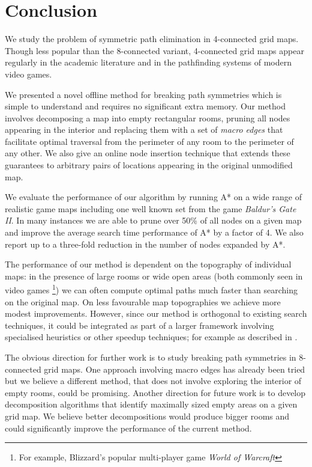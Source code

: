 \section{Conclusion}
We study the problem of symmetric path elimination in 4-connected grid maps.
Though less popular than the 8-connected variant, 4-connected grid maps appear 
regularly in the academic literature and in the pathfinding systems of modern
video games.
\par
We presented a novel offline method for breaking path symmetries which is simple
to understand and requires no significant extra memory. 
Our method involves decomposing a map into empty rectangular rooms, pruning all nodes
appearing in the interior and replacing them with a set of \emph{macro edges}
that facilitate optimal traversal from the perimeter of any room to the perimeter
of any other.
We also give an online node insertion technique that extends these guarantees
 to arbitrary pairs of locations appearing in the original unmodified map.
\par
We evaluate the performance of our algorithm by running A* on a wide
range of realistic game maps including one well known set from the game
\emph{Baldur's Gate II}. 
In many instances we are able to prune over 50\% of all nodes on a given map
and improve the average search time performance of A* by a factor of 4.
We also report up to a three-fold reduction in the number of nodes expanded
by A*.
\par
The performance of our method is dependent on the topography of individual maps: 
in the presence of large rooms or wide open areas (both commonly seen in video games 
\footnote{For example, Blizzard's popular multi-player game \emph{World of Warcraft}})
we can often compute optimal paths much faster than searching on the original map. 
On less favourable map topographies we achieve more modest improvements.
However, since our method is orthogonal to existing search techniques, it could be integrated
as part of a larger framework involving specialised heuristics or other speedup techniques; 
for example as described in \cite{botea04,bjornsson05,bjornsson06}. 
\par
The obvious direction for further work is to study breaking path symmetries
in 8-connected grid maps.
One approach involving macro edges has already been tried 
\cite{bolanca09} but we believe a different method, that does not involve
exploring the interior of empty rooms, could be promising.
Another direction for future work is to develop decomposition algorithms that identify maximally
sized empty areas on a given grid map.
We believe better decompositions would produce bigger rooms and could significantly improve 
the performance of the current method.
